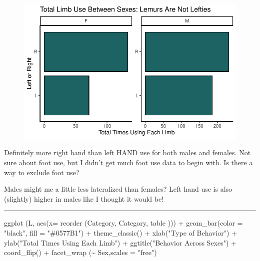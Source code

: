 \documentclass[
  letterpaper,
  DIV=11,
  numbers=noendperiod]{scrartcl}
\newenvironment{Shaded}{\begin{snugshade}}{\end{snugshade}}
\newcommand{\AttributeTok}[1]{\textcolor[rgb]{0.40,0.45,0.13}{#1}}
\newcommand{\FunctionTok}[1]{\textcolor[rgb]{0.28,0.35,0.67}{#1}}
\newcommand{\NormalTok}[1]{\textcolor[rgb]{0.00,0.23,0.31}{#1}}
\newcommand{\SpecialCharTok}[1]{\textcolor[rgb]{0.37,0.37,0.37}{#1}}
\newcommand{\StringTok}[1]{\textcolor[rgb]{0.13,0.47,0.30}{#1}}
\begin{document}
\begin{figure}[H]

{\centering \includegraphics{LeftyLemurs_files/figure-pdf/unnamed-chunk-21-1.pdf}

}

\end{figure}

Definitely more right hand than left HAND use for both males and
females. Not sure about foot use, but I didn't get much foot use data to
begin with. Is there a way to exclude foot use?

Males might me a little less lateralized than females? Left hand use is
also (slightly) higher in males like I thought it would be!

\begin{center}\rule{0.5\linewidth}{0.5pt}\end{center}

\begin{Shaded}
\begin{Highlighting}[]
\FunctionTok{ggplot}\NormalTok{ (L, }\FunctionTok{aes}\NormalTok{(}\AttributeTok{x=} \FunctionTok{reorder}\NormalTok{ (Category, Category, table ))) }\SpecialCharTok{+}
  \FunctionTok{geom\_bar}\NormalTok{(}\AttributeTok{color =} \StringTok{"black"}\NormalTok{, }\AttributeTok{fill =} \StringTok{"\#0577B1"}\NormalTok{) }\SpecialCharTok{+}
  \FunctionTok{theme\_classic}\NormalTok{() }\SpecialCharTok{+}
  \FunctionTok{xlab}\NormalTok{(}\StringTok{"Type of Behavior"}\NormalTok{) }\SpecialCharTok{+}
  \FunctionTok{ylab}\NormalTok{(}\StringTok{"Total Times Using Each Limb"}\NormalTok{) }\SpecialCharTok{+}
  \FunctionTok{ggtitle}\NormalTok{(}\StringTok{"Behavior Across Sexes"}\NormalTok{) }\SpecialCharTok{+}
  \FunctionTok{coord\_flip}\NormalTok{() }\SpecialCharTok{+}
  \FunctionTok{facet\_wrap}\NormalTok{ (}\SpecialCharTok{\textasciitilde{}}\NormalTok{ Sex,}\AttributeTok{scales =} \StringTok{"free"}\NormalTok{)}
\end{Highlighting}
\end{Shaded}
\end{document}
